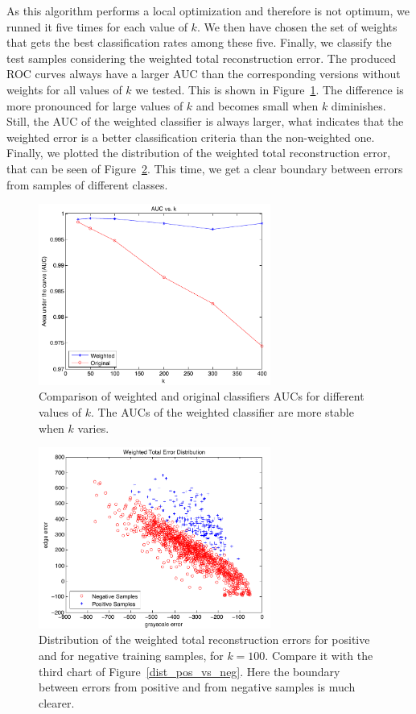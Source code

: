 \documentclass[10pt, conference, compsocconf]{IEEEtran}
\begin{document}
As this algorithm performs a local optimization and therefore is not optimum, we runned it five times for each value of $k$. We then have chosen the set of weights that gets the best classification rates among these five. Finally, we classify the test samples considering the weighted total reconstruction error. The produced ROC curves always have a larger AUC than the corresponding versions without weights for all values of $k$ we tested. This is shown in Figure~\ref{auc_vs_k}. The difference is more pronounced for large values of $k$ and becomes small when $k$ diminishes. Still, the AUC of the weighted classifier is always larger, what indicates that the weighted error is a better classification criteria than the non-weighted one. Finally, we plotted the distribution of the weighted total reconstruction error, that can be seen of Figure~\ref{dist_weighted}. This time, we get a clear boundary between errors from samples of different classes.

\begin{figure}[t]
\centering
\includegraphics[width=3in]{chart_auc_vs_k}
\caption{Comparison of weighted and original classifiers AUCs for different values of $k$. The AUCs of the weighted classifier are more stable when $k$ varies.}
\label{auc_vs_k}
\end{figure}

\begin{figure}[t]
\centering
\includegraphics[width=3in]{dist_gray_vs_edge_weighted}
\caption{Distribution of the weighted total reconstruction errors for positive and for negative training samples, for $k=100$. Compare it with the third chart of Figure~\ref{dist_pos_vs_neg}. Here the boundary between errors from positive and from negative samples is much clearer.}
\label{dist_weighted}
\end{figure}
\end{document}
